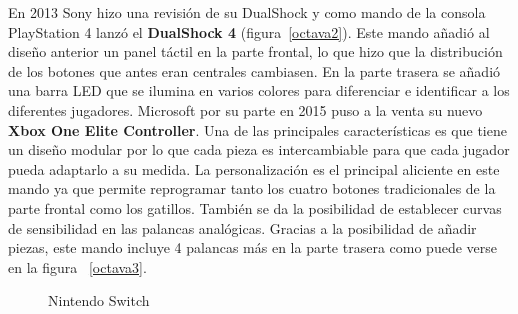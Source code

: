 En 2013 Sony hizo una revisi\'on de su DualShock y como mando de la consola PlayStation 4 lanz\'o el \textbf{DualShock 4} (figura~\ref{octava2}). Este mando a\~nadi\'o al dise\~no anterior un panel t\'actil en la parte frontal, lo que hizo que la distribuci\'on de los botones que antes eran centrales cambiasen. En la parte trasera se a\~nadi\'o una barra LED que se ilumina en varios colores para diferenciar e identificar a los diferentes jugadores. Microsoft por su parte en 2015 puso a la venta su nuevo \textbf{Xbox One Elite Controller}. Una de las principales caracter\'isticas es que tiene un dise\~no modular por lo que cada pieza es intercambiable para que cada jugador pueda adaptarlo a su medida. La personalizaci\'on es el principal aliciente en este mando ya que permite reprogramar tanto los cuatro botones tradicionales de la parte frontal como los gatillos. Tambi\'en se da la posibilidad de establecer curvas de sensibilidad en las palancas anal\'ogicas. Gracias a la posibilidad de a\~nadir piezas, este mando incluye 4 palancas m\'as en la parte trasera como puede verse en la figura~ \ref{octava3}.\\

\begin{figure}[t]

 \hfill
    
     \caption{Nintendo Switch}
     \label{fig:octava2}
   \end{figure}

